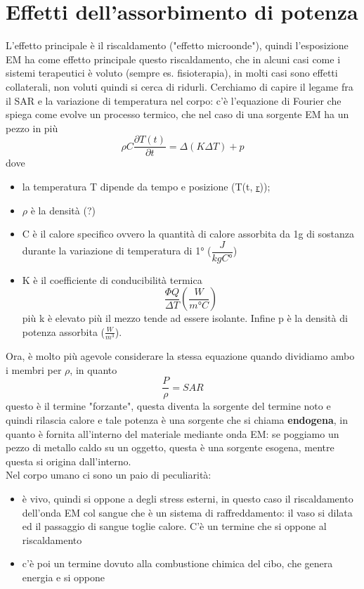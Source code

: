\documentclass[oneside, 12pt]{extbook}
\begin{document}
\section{Effetti dell'assorbimento di potenza}
L'effetto principale è il riscaldamento ("effetto microonde"), quindi l'esposizione EM ha come effetto principale questo riscaldamento, che in alcuni casi come i sistemi terapeutici è voluto (sempre es. fisioterapia), in molti casi sono effetti collaterali, non voluti quindi si cerca di ridurli. Cerchiamo di capire il legame fra il SAR e la variazione di temperatura nel corpo: c'è l'equazione di Fourier che spiega come evolve un processo termico, che nel caso di una sorgente EM ha un pezzo in più
\begin{equation}
	\rho C \frac{\partial T(t)}{\partial t} = \Delta (K \Delta T) + p
\end{equation}
dove 
\begin{itemize}
	\item la temperatura T dipende da tempo e posizione (T(t, \underline{r}));
	\item $\rho$ è la densità (?)
	\item C è il calore specifico ovvero la quantità di calore assorbita da 1g di sostanza durante la variazione di temperatura di 1° ($\dfrac{J}{kgC°}$)
	\item K è il coefficiente di conducibilità termica
	\begin{equation}
		\frac{\Phi Q}{\Delta T} (\dfrac{W}{m°C})
	\end{equation}
	più k è elevato più il mezzo tende ad essere isolante. Infine p è la densità di potenza assorbita ($\frac{W}{m^3}$).\\ 
\end{itemize}
Ora, è molto più agevole considerare la stessa equazione quando dividiamo ambo i membri per $\rho$, in quanto
\begin{equation}
	\frac{P}{\rho} = SAR
\end{equation}
questo è il termine "forzante", questa diventa la sorgente del termine noto e quindi rilascia calore e tale potenza è una sorgente che si chiama \textbf{endogena}, in quanto è fornita all'interno del materiale mediante onda EM: se poggiamo un pezzo di metallo caldo su un oggetto, questa è una sorgente esogena, mentre questa si origina dall'interno.\\Nel corpo umano ci sono un paio di peculiarità:
\begin{itemize}
	\item è vivo, quindi si oppone a degli stress esterni, in questo caso il riscaldamento dell'onda EM col sangue che è un sistema di raffreddamento: il vaso si dilata ed il passaggio di sangue toglie calore. C'è un termine che si oppone al riscaldamento
	\item c'è poi un termine dovuto alla combustione chimica del cibo, che genera energia e si oppone
\end{itemize}
\end{document}
